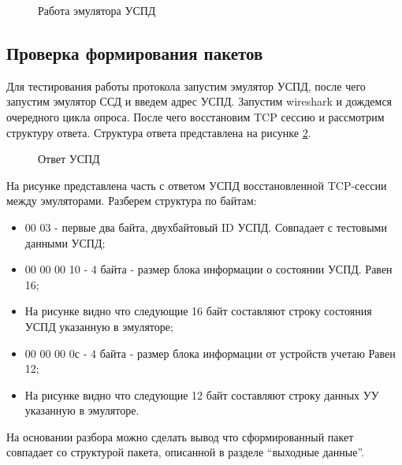 \begin{figure}[ht!]
 \caption{Работа эмулятора УСПД}
 \label{client_log:client_log}
\end{figure}

\subsection{Проверка формирования пакетов}

Для тестирования работы протокола запустим эмулятор УСПД, после чего запустим эмулятор ССД и введем адрес УСПД. Запустим wireshark\cite{nix} и дождемся очередного цикла опроса. После чего восстановим TCP сессию и рассмотрим структуру ответа. Структура ответа представлена на рисунке \ref{img:test_pachete}.

\begin{figure}[ht!]
 \caption{Ответ УСПД}
 \label{img:test_pachete}
\end{figure}

На рисунке представлена часть с ответом УСПД восстановленной TCP-сессии между эмуляторами. Разберем структура по байтам:

\begin{itemize}
 \item 00 03 - первые два байта, двухбайтовый ID УСПД. Совпадает с тестовыми данными УСПД;
 \item 00 00 00 10 - 4 байта - размер блока информации о состоянии УСПД. Равен 16;
 \item На рисунке видно что следующие 16 байт составляют строку состояния УСПД указанную в эмуляторе;
 \item 00 00 00 0с - 4 байта - размер блока информации от устройств учетаю Равен 12;
 \item На рисунке видно что следующие 12 байт составляют строку данных УУ указанную в эмуляторе.
\end{itemize}

На основании разбора можно сделать вывод что сформированный пакет совпадает со структурой пакета, описанной в разделе ``выходные данные''.

